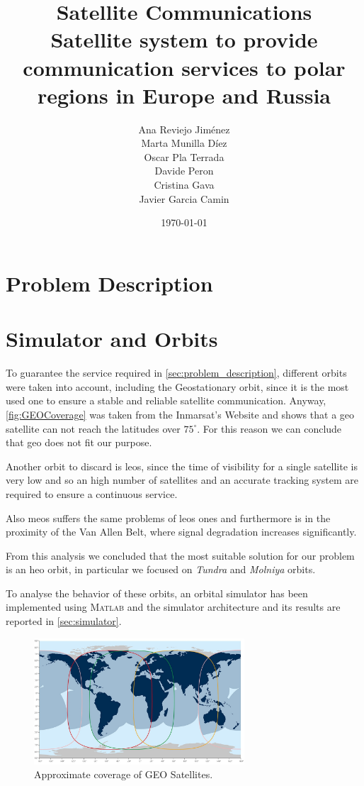 \documentclass[11pt,a4paper,titlepage]{article}
\title{\blue Satellite Communications \\
\blueb Satellite system to provide communication services to polar regions in Europe and Russia}
\author{Ana Reviejo Jiménez \\ Marta Munilla Díez\\ Oscar Pla Terrada\\ Davide Peron\\ Cristina Gava\\ Javier Garcia Camin}
\date{\today}
\begin{document}
\maketitle

\tableofcontents
\clearpage

\section{Problem Description} \label{sec:problem_description}
	

\section{Simulator and Orbits} \label{sec:orbit}
	To guarantee the service required in \autoref{sec:problem_description}, different orbits were taken into account, including the Geostationary orbit, since it is the most used one to ensure a stable and reliable satellite communication.
	Anyway, \autoref{fig:GEOCoverage} was taken from the Inmarsat's Website and shows that a \gls{geo} satellite can not reach the latitudes over $75^\circ$. For this reason we can conclude that \gls{geo} does not fit our purpose.

	Another orbit to discard is \glspl{leo}, since the time of visibility for a single satellite is very low and so an high number of satellites and an accurate tracking system are required to ensure a continuous service.

	Also \glspl{meo} suffers the same problems of \glspl{leo} ones and furthermore is in the proximity of the Van Allen Belt, where signal degradation increases significantly.

	From this analysis we concluded that the most suitable solution for our problem is an \gls{heo} orbit, in particular we focused on \textit{Tundra} and \textit{Molniya} orbits.

	To analyse the behavior of these orbits, an orbital simulator has been implemented using \textsc{Matlab} and the simulator architecture and its results are reported in \autoref{sec:simulator}.

	\begin{figure}
		\centering
		\includegraphics[width=0.7\textwidth]{figures/GEOCoverage.jpeg}
		\caption{Approximate coverage of GEO Satellites.}
		\label{fig:GEOCoverage}
	\end{figure}
\end{document}
